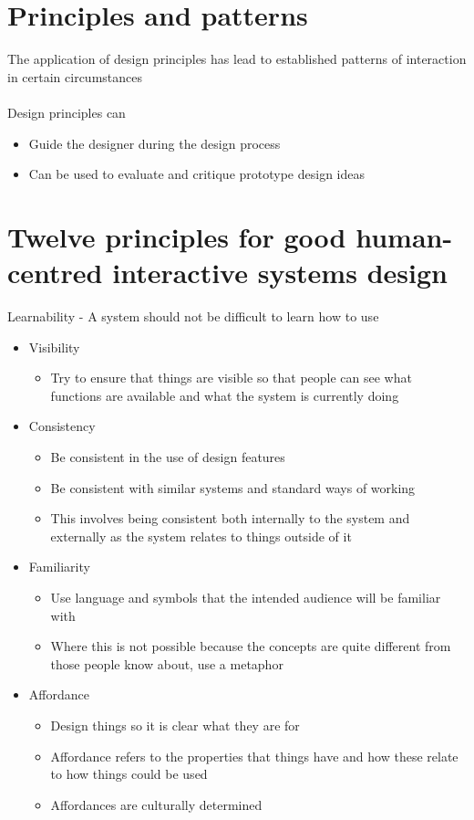 \documentclass{article}[18pt]
\begin{document}
\section{Principles and patterns}
The application of design principles has lead to established patterns of interaction in certain circumstances\\
\\
Design principles can
\begin{itemize}
	\item Guide the designer during the design process
	\item Can be used to evaluate and critique prototype design ideas
\end{itemize}
\newpage
\section{Twelve principles for good human-centred interactive systems design}
Learnability - A system should not be difficult to learn how to use
\begin{itemize}
	\item Visibility
	\begin{itemize}
		\item Try to ensure that things are visible so that people can see what functions are available and what the system is currently doing
	\end{itemize}
	\item Consistency
	\begin{itemize}
		\item Be consistent in the use of design features
		\item Be consistent with similar systems and standard ways of working
		\item This involves being consistent both internally to the system and externally as the system relates to things outside of it
	\end{itemize}
	\item Familiarity
	\begin{itemize}
		\item Use language and symbols that the intended audience will be familiar with
		\item Where this is not possible because the concepts are quite different from those people know about, use a metaphor
	\end{itemize}
	\item Affordance
	\begin{itemize}
		\item Design things so it is clear what they are for
		\item Affordance refers to the properties that things have and how these relate to how things could be used
		\item Affordances are culturally determined
	\end{itemize}
\end{itemize}
\end{document}
